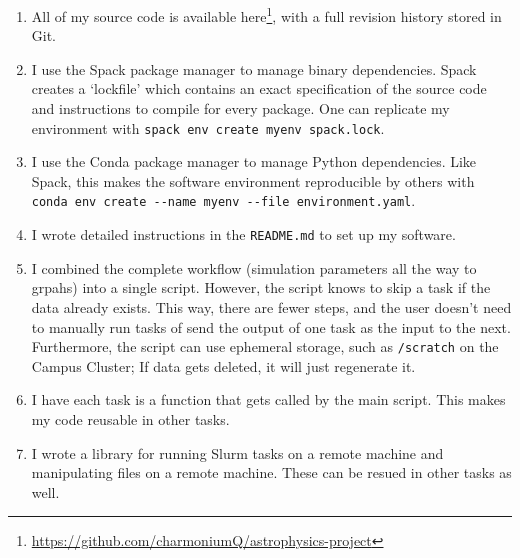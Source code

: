 \begin{enumerate}
\item All of my source code is available here\footnote{\url{https://github.com/charmoniumQ/astrophysics-project}}, with a full revision history stored in Git.
\item I use the Spack package manager \cite{gamblin_spack_2015} to manage binary dependencies. Spack creates a `lockfile' which contains an exact specification of the source code and instructions to compile for every package. One can replicate my environment with \verb+spack env create myenv spack.lock+.
\item I use the Conda package manager to manage Python dependencies. Like Spack, this makes the software environment reproducible by others with \verb+conda env create --name myenv --file environment.yaml+.
\item I wrote detailed instructions in the \verb+README.md+ to set up my software.
\item I combined the complete workflow (simulation parameters all the way to grpahs) into a single script. However, the script knows to skip a task if the data already exists. This way, there are fewer steps, and the user doesn't need to manually run tasks of send the output of one task as the input to the next. Furthermore, the script can use ephemeral storage, such as \verb+/scratch+ on the Campus Cluster; If data gets deleted, it will just regenerate it.
\item I have each task is a function that gets called by the main script. This makes my code reusable in other tasks.
\item I wrote a library for running Slurm tasks on a remote machine and manipulating files on a remote machine. These can be resued in other tasks as well.
\end{enumerate}

